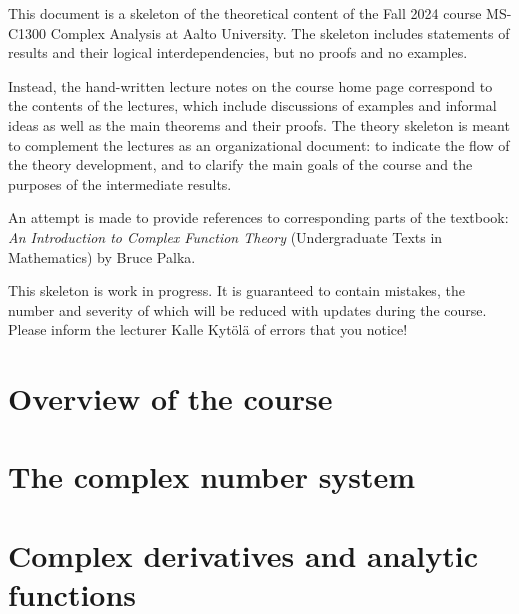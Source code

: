 %

This document is a skeleton of the theoretical content of
the Fall 2024 course MS-C1300 Complex Analysis at Aalto University.
The skeleton includes statements of results and their
logical interdependencies, but no proofs and no examples.

Instead, the hand-written lecture notes on the course home page correspond
to the contents of the lectures, which include discussions of examples and
informal ideas as well as the main theorems and their proofs.
The theory skeleton is meant to complement the lectures as
an organizational document: to indicate the flow of the theory
development, and to clarify the main goals of the course and the
purposes of the intermediate results.

An attempt is made to provide references to corresponding parts of
the textbook: \emph{An Introduction to Complex Function Theory}
(Undergraduate Texts in Mathematics) by Bruce Palka.

This skeleton is work in progress. It is guaranteed to contain mistakes,
the number and severity of which will be reduced with updates
during the course. Please inform the lecturer Kalle Kytölä of
errors that you notice!

\chapter{Overview of the course}


\chapter{The complex number system}



\chapter{Complex derivatives and analytic functions}


